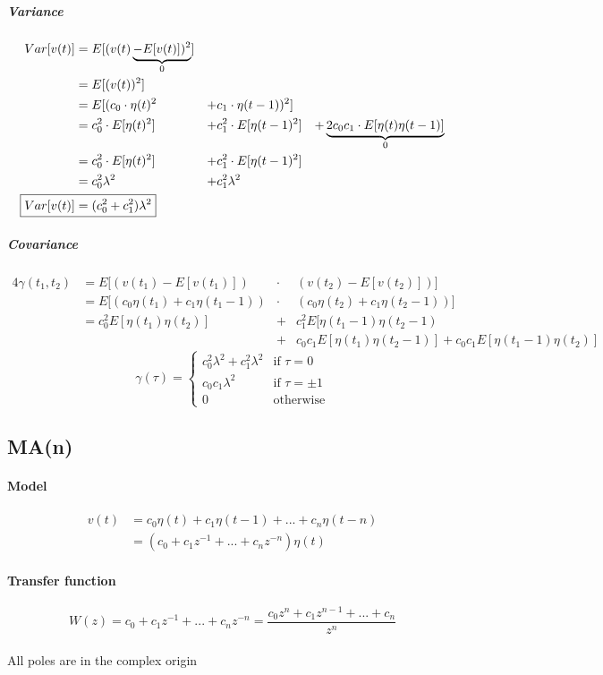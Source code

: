 \documentclass{report}
\begin{document}
\subparagraph{Variance}
\begin{alignat*}{3}
	Var[v(t)]	&=	E[(v(t)	\underbrace{-E[v(t)])^2}_{0}]													\\
				&=	E[(v(t))^2]						\\
				&=	E[(c_0\cdot	\eta(t)^2		&+&	c_1\cdot	\eta(t-1))^2]	\\
				&=	c_0^2\cdot 	E[\eta(t)^2]		&+&	c_1^2\cdot E[\eta(t-1)^2]	&+	\underbrace{2 c_0 c_1 \cdot E[\eta(t)\eta(t-1)]}_0\\
				&=	c_0^2\cdot 	E[\eta(t)^2]		&+&	c_1^2\cdot E[\eta(t-1)^2]\\
				&=	c_0^2\lambda^2				&+&	c_1^2\lambda^2\\
	\Aboxed{Var[v(t)]&=(c_0^2+c_1^2)\lambda^2}
\end{alignat*}


\subparagraph{Covariance}
\begin{alignat*}{4}
	\gamma(t_1,t_2)	&=	E[(v(t_1)-E[v(t_1)])				&\cdot 	&		(v(t_2)-E[v(t_2)])]\\
					&=	E[(c_0\eta(t_1)+c_1\eta(t_1-1))	&\cdot 	&		(c_0\eta(t_2)+c_1\eta(t_2-1))]\\
					&=	c_0^2E[\eta(t_1)\eta(t_2)]		&+&				c_1^2E[\eta(t_1-1)\eta(t_2-1)\\
					&									&+&				c_0c_1E[\eta(t_1)\eta(t_2-1)]
						+c_0c_1E[\eta(t_1-1)\eta(t_2)]
\end{alignat*}
\[
\boxed{
	\gamma(\tau)=\begin{cases}
		c_0^2\lambda^2+c_1^2\lambda^2	&\text{if }\tau=0\\
		c_0c_1\lambda^2					&\text{if }\tau=\pm 1\\
		0								&\text{otherwise}
	\end{cases}
}
\]

\subsection{MA(n)}

\paragraph{Model}
\begin{align*}
v(t)&=c_0\eta(t)+c_1\eta(t-1)+...+c_n\eta(t-n)\\
&=(c_0+c_1z^{-1}+...+c_nz^{-n})\eta(t)
\end{align*}

\paragraph{Transfer function}
\[W(z)
=c_0+c_1z^{-1}+...+c_nz^{-n}
=\frac{c_0z^n+c_1z^{n-1}+...+c_n}{z^n}
\]\\
All poles are in the complex origin
\end{document}
